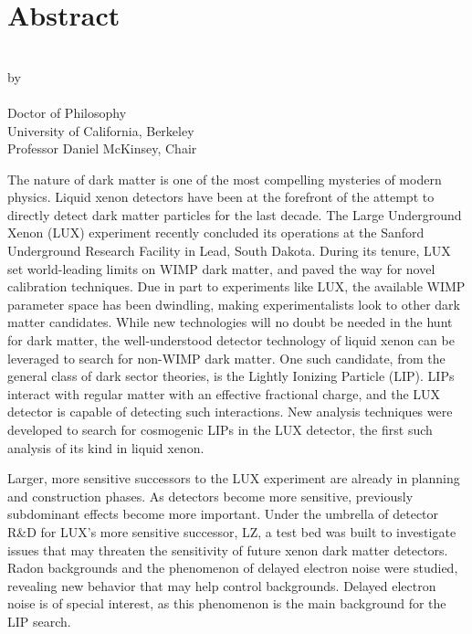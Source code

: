 


\begingroup
\let\clearpage\relax
\let\cleardoublepage\relax
\let\cleardoublepage\relax

\chapter*{Abstract}

\begin{center}
\myTitle \\ \bigskip
by \\ \bigskip
\myName \\ \bigskip
Doctor of Philosophy \\ \smallskip
University of California, Berkeley \\ \smallskip
Professor Daniel McKinsey, Chair \\
\end{center}

\vspace{2cm}

\noindent The nature of dark matter is one of the most compelling mysteries of modern physics. Liquid xenon detectors have been at the forefront of the attempt to directly detect dark matter particles for the last decade. The Large Underground Xenon (LUX) experiment recently concluded its operations at the Sanford Underground Research Facility in Lead, South Dakota. During its tenure, LUX set world-leading limits on WIMP dark matter, and paved the way for novel calibration techniques. Due in part to experiments like LUX, the available WIMP parameter space has been dwindling, making experimentalists look to other dark matter candidates. While new technologies will no doubt be needed in the hunt for dark matter, the well-understood detector technology of liquid xenon can be leveraged to search for non-WIMP dark matter. One such candidate, from the general class of dark sector theories, is the Lightly Ionizing Particle (LIP). LIPs interact with regular matter with an effective fractional charge, and the LUX detector is capable of detecting such interactions. New analysis techniques were developed to search for cosmogenic LIPs in the LUX detector, the first such analysis of its kind in liquid xenon. 

Larger, more sensitive successors to the LUX experiment are already in planning and construction phases. As detectors become more sensitive, previously subdominant effects become more important. Under the umbrella of detector R\&D for LUX's more sensitive successor, LZ, a test bed was built to investigate issues that may threaten the sensitivity of future xenon dark matter detectors. Radon backgrounds and the phenomenon of delayed electron noise were studied, revealing new behavior that may help control backgrounds. Delayed electron noise is of special interest, as this phenomenon is the main background for the LIP search.

\endgroup			

\vfill

